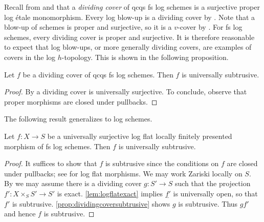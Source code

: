 \documentclass[10pt]{amsart}
\newcommand{\ul}{\underline}
\begin{document}
Recall from \cite[Definition 3.1.4]{logDM} and \cite{Par} that a \emph{dividing cover} 
of qcqs fs log schemes is a surjective proper log étale monomorphism.
Every log blow-up is a dividing cover by \cite[Example A.11.1]{logDM}. 
Note that a blow-up of schemes is proper and surjective, 
so it is a $v$-cover by \cite[Remark 2.5 (1a)]{Rydh}.
For fs log schemes,
every dividing cover is proper and surjective.
It is therefore reasonable to expect that log blow-ups, or more generally dividing covers, 
are examples of covers in the log $h$-topology. 
This is shown in the following proposition.

\begin{proposition}\label{prop:dividingcoversubtrusive}
Let $f$ be a dividing cover of qcqs fs log schemes. Then $f$ is universally subtrusive.
\end{proposition}
\begin{proof}
By \cite[Proposition A.11.6]{logDM} a dividing cover is universally surjective. 
To conclude, observe that proper morphisms are closed under pullbacks.
\end{proof}

The following result generalizes \cite[Remark 2.5 (2a)]{Rydh} to log schemes.

\begin{proposition}\label{prop:logflatsubtrusive}
Let $f\colon X\to S$ be a universally surjective log flat locally finitely presented morphism of fs log schemes. Then $f$ is universally subtrusive.
\end{proposition}
\begin{proof}
It suffices to show that $f$ is subtrusive since the 
conditions on $f$ are closed under pullbacks;
see \cite[Proposition IV.4.1.2 (3)]{Ogu} for log flat morphisms.
We may work Zariski locally on $S$.
By \cite[Theorem 1.1]{integrallogblowup} we may assume there is a dividing cover 
$g\colon S' \to S$ such that the projection $f'\colon X \times_S S' \to S'$ is exact.
\cref{lem:logflatexact} implies $\ul{f'}$ is universally open, 
so that $f'$ is subtrusive.
\cref{prop:dividingcoversubtrusive} shows $g$ is subtrusive.
Thus $gf'$ and hence $f$ is subtrusive.
\end{proof}
\end{document}

